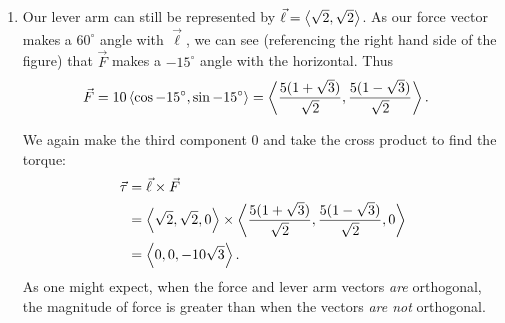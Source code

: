 \begin{example}
\begin{enumerate}
	Since the force vector is perpendicular to the lever arm (as seen in the left hand side of \autoref{fig:crossp7}), we can conclude it is making an angle of $-45^\circ$ with the horizontal. As it has a magnitude of 10lb, we can state $\vec F = 10\bracket{\cos (-45^\circ), \sin(-45^\circ)}= \bracket{5\sqrt2,-5\sqrt2}.$
	
	Using  to find the torque requires a cross product. We again let the third component of each vector be 0  and compute the cross product:
	\begin{align*}
	\vec\tau &= \vec \ell\times\vec F \\
				&= \bracket{\sqrt2,\sqrt2,0}\times \bracket{5\sqrt2,-5\sqrt2,0}\\
				&= \bracket{0,0,-20}
	\end{align*}
	This clearly has a magnitude of 20 ft-lb.
		
	We can view the force and lever arm vectors as lying ``on the page''; our computation of $\vec\tau$ shows that the torque goes ``into the page.'' This follows the Right Hand Rule of the cross product, and it also matches well with the example of the wrench turning the bolt. Turning a bolt clockwise moves it in.
	
	\item		Our lever arm can still be represented by $\vec \ell = \left\langle \sqrt2,\sqrt2\right\rangle$. As our force vector makes a $60^\circ$ angle with $\vec \ell$, we can see (referencing the right hand side of the figure) that $\vec F$ makes a $-15^\circ$ angle with the horizontal. Thus 
	\begin{align*}
	\vec F = 10\left\langle \cos-15^\circ,\sin-15^\circ\right\rangle&= \left\langle \frac{5(1+\sqrt3)}{\sqrt2},\frac{5(1-\sqrt3)}{\sqrt2}\right\rangle
	.\end{align*}
	
	We again make the third component 0 and take the cross product to find the torque:
	\begin{align*}
	\vec\tau &= \vec \ell\times\vec F\\
	&= \left\langle \sqrt2,\sqrt2,0\right\rangle\times  \left\langle \frac{5(1+\sqrt3)}{\sqrt2},\frac{5(1-\sqrt3)}{\sqrt2},0\right\rangle\\
	&= \left\langle 0,0,-10\sqrt3\right\rangle
	.
	\end{align*}
	As one might expect, when the force and lever arm vectors \emph{are} orthogonal, the magnitude of force is greater than when the vectors \emph{are not} orthogonal.
\end{enumerate}
\end{example}

